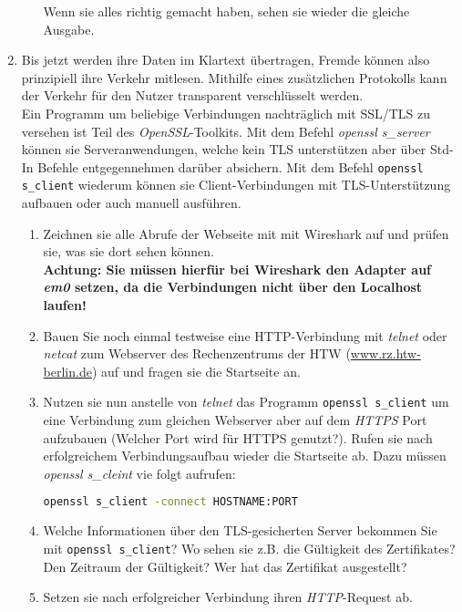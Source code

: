 \documentclass[paper=a4,fontsize=11pt]{scrartcl}%
\numberwithin{equation}{section}
\begin{document}
\begin{enumerate}
\begin{enumerate}
		Wenn sie alles richtig gemacht haben, sehen sie wieder die gleiche Ausgabe.
	\end{enumerate}
	\item Bis jetzt werden ihre Daten im Klartext übertragen, Fremde können also prinzipiell ihre Verkehr mitlesen. Mithilfe eines zusätzlichen Protokolls kann der Verkehr für den Nutzer transparent verschlüsselt werden.\\
		Ein Programm um beliebige Verbindungen nachträglich mit SSL/TLS zu versehen ist Teil des \emph{OpenSSL}-Toolkits. Mit dem Befehl \emph{openssl s\_server} können sie Serveranwendungen, welche kein TLS unterstützen aber über Std-In Befehle entgegennehmen darüber absichern. Mit dem Befehl \texttt{openssl s\_client} wiederum können sie Client-Verbindungen mit TLS-Unterstützung aufbauen oder auch manuell ausführen.
	\begin{enumerate}
		\item Zeichnen sie alle Abrufe der Webseite mit mit Wireshark auf und prüfen sie, was sie dort sehen können.\\ \textbf{Achtung: Sie müssen hierfür bei Wireshark den Adapter auf \emph{em0} setzen, da die Verbindungen nicht über den Localhost laufen!}
		\item Bauen Sie noch einmal testweise eine HTTP-Verbindung mit \emph{telnet} oder \emph{netcat} zum Webserver des Rechenzentrums der HTW (\url{www.rz.htw-berlin.de}) auf und fragen sie die Startseite an.
 		\item Nutzen sie nun anstelle von \emph{telnet} das Programm \texttt{openssl s\_client} um eine Verbindung zum gleichen Webserver aber auf dem \emph{HTTPS} Port aufzubauen (Welcher Port wird für HTTPS genutzt?). Rufen sie nach erfolgreichem Verbindungsaufbau wieder die Startseite ab. Dazu müssen \emph{openssl s\_cleint} vie folgt aufrufen:
 		\begin{lstlisting}[style=Bash, language=Bash]
openssl s_client -connect HOSTNAME:PORT
\end{lstlisting}
 		\item Welche Informationen über den TLS-gesicherten Server bekommen Sie mit \texttt{openssl s\_client}? Wo sehen sie z.B. die Gültigkeit des Zertifikates? Den Zeitraum der Gültigkeit? Wer hat das Zertifikat ausgestellt?
 		\item Setzen sie nach erfolgreicher Verbindung ihren \emph{HTTP}-Request ab.
	\end{enumerate}
\end{enumerate}
\end{document}

